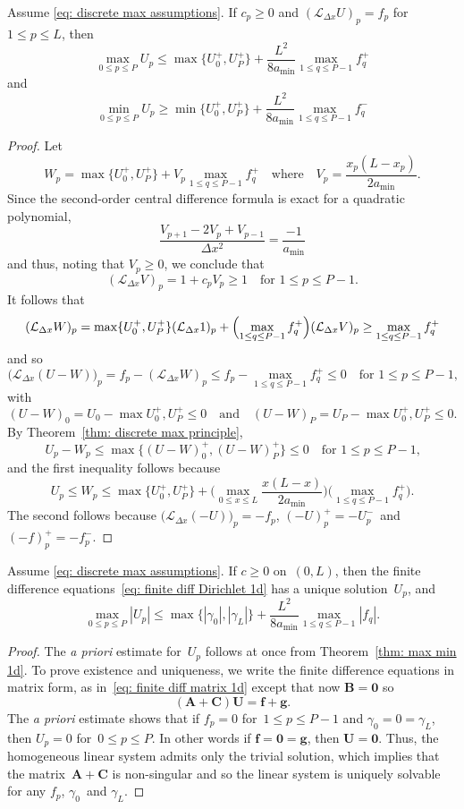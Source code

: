 \begin{theorem}
Assume \eqref{eq: discrete max assumptions}.
If $c_p\ge0$ and $(\mathcal{L}_{\Delta x}U)_p=f_p$ for $1\le p\le L$, then
\[
\max_{0\le p\le P}U_p\le\max\{U^+_0,U^+_P\}+\frac{L^2}{8a_{\min}}
	\max_{1\le q\le P-1}f_q^+
\]
and
\[
\min_{0\le p\le P}U_p\ge\min\{U^+_0,U^+_P\}+\frac{L^2}{8a_{\min}}
	\max_{1\le q\le P-1}f_q^-
\]
\end{theorem}
\begin{proof}
Let 
\[
W_p=\max\{U^+_0,U^+_P\}+V_p\max_{1\le q\le P-1}f_q^+
\quad\text{where}\quad
V_p=\frac{x_p(L-x_p)}{2a_{\min}}.
\]
Since the second-order central difference formula is exact for a quadratic 
polynomial,
\[
\frac{V_{p+1}-2V_p+V_{p-1}}{\Delta x^2}=\frac{-1}{a_{\min}}
\]
and thus, noting that $V_p\ge0$, we conclude that
\[
(\mathcal{L}_{\Delta x}V)_p=1+c_pV_p\ge1\quad\text{for $1\le p\le P-1$.}
\]
It follows that
\[
(\mathcal{L}_{\Delta x}W)_p=\max\{U^+_0,U^+_P\}(\mathcal{L}_{\Delta x}1)_p
	+\Bigl(\max_{1\le q\le P-1}f_q^+\Bigr)(\mathcal{L}_{\Delta x}V)_p
	\ge\max_{1\le q\le P-1}f_q^+
\]
and so
\[
\bigl(\mathcal{L}_{\Delta x}(U-W)\bigr)_p=f_p-(\mathcal{L}_{\Delta x}W)_p
	\le f_p-\max_{1\le q\le P-1}f_q^+\le0\quad\text{for $1\le p\le P-1$,}
\]
with
\[
(U-W)_0=U_0-\max{U_0^+,U_P^+}\le0
\quad\text{and}\quad
(U-W)_P=U_P-\max{U_0^+,U_P^+}\le0.
\]
By Theorem~\ref{thm: discrete max principle},
\[
U_p-W_p\le\max\{(U-W)_0^+,(U-W)_P^+\}\le0\quad\text{for $1\le p\le P-1$,}
\]
and the first inequality follows because
\[
U_p\le W_p\le\max\{U^+_0,U^+_P\}
	+\biggl(\max_{0\le x\le L}\frac{x(L-x)}{2a_{\min}}\biggr)
	\biggl(\max_{1\le q\le P-1}f_q^+\biggr). 
\]
The second follows because $\bigl(\mathcal{L}_{\Delta x}(-U)\bigr)_p=-f_p$,
$(-U)_p^+=-U_p^-$~and $(-f)_p^+=-f_p^-$.
\end{proof}

\begin{theorem}
Assume \eqref{eq: discrete max assumptions}. If $c\ge0$ on~$(0,L)$, then the
finite difference equations~\eqref{eq: finite diff Dirichlet 1d} has a unique
solution~$U_p$, and
\[
\max_{0\le p\le P}|U_p|\le\max\{|\gamma_0|,|\gamma_L|\}
    +\frac{L^2}{8a_{\min}}\max_{1\le q\le P-1}|f_q|.
\]
\end{theorem}
\begin{proof}
The \emph{a priori} estimate for~$U_p$ follows at once from 
Theorem~\ref{thm: max min 1d}.  To prove existence and uniqueness, we write the 
finite difference equations in matrix form, as 
in~\eqref{eq: finite diff matrix 1d} except that 
now $\boldsymbol{B}=\boldsymbol{0}$ so
\[
(\boldsymbol{A}+\boldsymbol{C})\boldsymbol{U}=\boldsymbol{f}+\boldsymbol{g}.
\]
The \emph{a priori} estimate shows that if $f_p=0$ for~$1\le p\le P-1$ and 
$\gamma_0=0=\gamma_L$, then $U_p=0$ for~$0\le p\le P$.  In other words if 
$\boldsymbol{f}=\boldsymbol{0}=\boldsymbol{g}$, then 
$\boldsymbol{U}=\boldsymbol{0}$.  Thus, the homogeneous linear system admits 
only the trivial solution, which implies that the 
matrix~$\boldsymbol{A}+\boldsymbol{C}$ is non-singular and so the linear system 
is uniquely solvable for any $f_p$, $\gamma_0$~and $\gamma_L$.
\end{proof}

